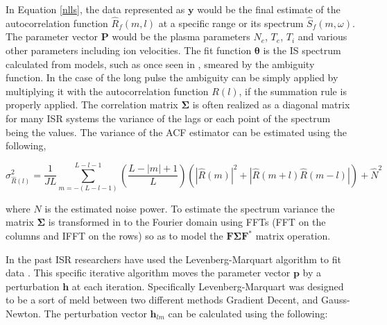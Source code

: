 \documentclass[10pt]{report}
\begin{document}
In Equation \ref{nlls}, the data represented as $\mathbf{y}$ would be the final estimate of the autocorrelation function $\hat{R}_f(m,l)$ at a specific range or its spectrum $\hat{S}_f(m,\omega)$.  The parameter vector $\mathbf{P}$ would be the plasma parameters $N_e$, $T_e$, $T_i$ and various other parameters including ion velocities. The fit function $\bm{\theta}$ is the IS spectrum calculated from models, such as once seen in \cite{kudeki:milla:1}, smeared by the ambiguity function.  In the case of the long pulse the ambiguity can be simply applied by multiplying it with the autocorrelation function $R(l)$, if the summation rule is properly applied. The correlation matrix $\bm{\Sigma}$ is often realized as a diagonal matrix for many ISR systems the variance of the lags or each point of the spectrum being the values. The variance of the ACF estimator can be estimated using the following,

\begin{equation}
\label{eqn:acfvar}
\sigma_{\hat{R}(l)}^2=\frac{1}{JL}\displaystyle \sum_{m=-(L-l-1)}^{L-l-1}\left(\frac{L-|m|+1}{L}\right)\left(|\hat{R}(m)|^2 +|\hat{R}(m+l)\hat{R}(m-l)|\right) + \hat{N}^2
\end{equation}

\noindent where $N$ is the estimated noise power. To estimate the spectrum variance the matrix $\bm{\Sigma}$ is transformed in to the Fourier domain using FFTs (FFT on the columns and IFFT on the rows) so as to model the $\mathbf{F}\bm{\Sigma} \mathbf{F}^*$ matrix operation. 






In the past ISR researchers have used the Levenberg-Marquart algorithm to fit data \cite{nikoukar2008}.  This specific iterative algorithm moves the parameter vector $\mathbf{p}$ by a perturbation $\mathbf{h}$ at each iteration\cite{gavin:2013}.  Specifically Levenberg-Marquart was designed to be a sort of meld between two different methods Gradient Decent, and Gauss-Newton.  The perturbation vector $\mathbf{h}_{lm}$ can be calculated using the following:
\end{document}
